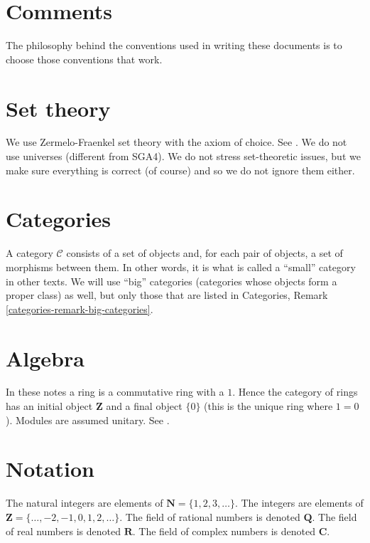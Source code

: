 \section{Comments}
\label{conventions-section-comments}
The philosophy behind the conventions used in writing these documents is
to choose those conventions that work.

\section{Set theory}
\label{conventions-section-sets}
We use Zermelo-Fraenkel set theory with the axiom of choice.
See \cite{Kunen}. We do not use
universes (different from SGA4). We do not stress set-theoretic issues,
but we make sure everything is correct (of course) and so we do not ignore
them either.

\section{Categories}
\label{conventions-section-categories}
A category $\mathcal{C}$ consists of a set of objects and, for each pair
of objects,
a set of morphisms between them. In other words, it is what is called
a ``small'' category in other texts. We will use ``big'' categories
(categories whose objects form a proper class)
as well, but only those that are listed in Categories,
Remark \ref{categories-remark-big-categories}.

\section{Algebra}
\label{conventions-section-algebra}
In these notes a ring is a commutative ring with a $1$. Hence the
category of rings has an initial object $\mathbf{Z}$ and a final
object $\{0\}$ (this is the unique ring where $1 = 0$). Modules are
assumed unitary. See \cite{Eisenbud}.

\section{Notation}
\label{conventions-section-notation}
The natural integers are elements of $\mathbf{N} = \{1, 2, 3, \ldots\}$.
The integers are elements of $\mathbf{Z} = \{\ldots, -2, -1, 0, 1, 2, \ldots\}$.
The field of rational numbers is denoted $\mathbf{Q}$.
The field of real numbers is denoted $\mathbf{R}$.
The field of complex numbers is denoted $\mathbf{C}$.


